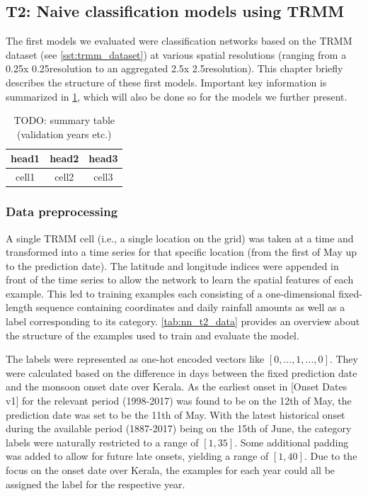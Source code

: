 \clearpage
\subsection{T2: Naive classification models using TRMM}
\label{sst:nn_t2}
The first models we evaluated were classification networks based on the TRMM dataset (see \cref{sst:trmm_dataset}) at various spatial resolutions (ranging from a 0.25\degree x 0.25\degree resolution to an aggregated 2.5\degree x 2.5\degree resolution). This chapter briefly describes the structure of these first models. Important key information is summarized in \cref{tab:nn_t2_summary}, which will also be done so for the models we further present.

\begin{table}[h]
  \centering
  \begin{tabular}{ |c|c|c| }
    \hline
    head1 & head2 & head3 \\
    \hline
    cell1 & cell2 & cell3 \\
    \hline
  \end{tabular}
  \caption{TODO: summary table (validation years etc.)}
  \label{tab:nn_t2_summary}
\end{table}

\subsubsection{Data preprocessing}
\label{ssst:nn_t2_data}
A single TRMM cell (i.e., a single location on the grid) was taken at a time and transformed into a time series for that specific location (from the first of May up to the prediction date). The latitude and longitude indices were appended in front of the time series to allow the network to learn the spatial features of each example. This led to training examples each consisting of a one-dimensional fixed-length sequence containing coordinates and daily rainfall amounts as well as a label corresponding to its category. \cref{tab:nn_t2_data} provides an overview about the structure of the examples used to train and evaluate the model.

The labels were represented as one-hot encoded vectors like $\left[ 0, ..., 1, ..., 0 \right]$. They were calculated based on the difference in days between the fixed prediction date and the monsoon onset date over Kerala. As the earliest onset in [Onset Dates v1] for the relevant period (1998-2017) was found to be on the 12th of May, the prediction date was set to be the 11th of May. With the latest historical onset during the available period (1887-2017) being on the 15th of June, the category labels were naturally restricted to a range of $\left[ 1, 35 \right]$. Some additional padding was added to allow for future late onsets, yielding a range of $\left[ 1, 40 \right]$. Due to the focus on the onset date over Kerala, the examples for each year could all be assigned the label for the respective year.

